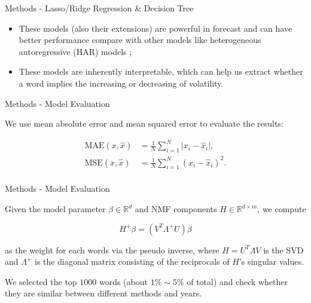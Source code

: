 \documentclass{beamer}
\begin{document}
\begin{frame}{Methods - Lasso/Ridge Regression \& Decision Tree}

  \begin{itemize}
    \item These models (also their extensions) are powerful in forecast and can have better performance compare with other models like heterogeneous autoregressive (HAR) models   ; \vspace{.25cm}
    \item These models are inherently interpretable, which can help us extract whether a word implies the increasing or decreasing of volatility.
  \end{itemize}

\end{frame}

\begin{frame}{Methods - Model Evaluation}

  We use mean absolute error and mean squared error to evaluate the results: \vspace{.25cm}

  $$
    \begin{aligned}
      \text{MAE}(x, \hat{x}) & = \frac{1}{N} \sum_{i=1}^N \vert x_i - \hat{x}_i \vert, \\
      \text{MSE}(x, \hat{x}) & = \frac{1}{N} \sum_{i=1}^N  (x_i - \hat{x}_i)^2.        \\
    \end{aligned}
  $$

\end{frame}

\begin{frame}{Methods - Model Evaluation}

  Given the model parameter $\beta \in \mathbb{R}^d$ and NMF components $H \in \mathbb{R}^{d \times m}$, we compute \vspace{.25cm}

  $$
    H^+ \beta = (V^T \Lambda^+ U) \beta
  $$ \vspace{.25cm}

  as the weight for each words via the pseudo inverse, where $H = U^T \Lambda V$ is the SVD and $\Lambda^+$ is the diagonal matrix consisting of the reciprocals of $H$’s singular values.

  We selected the top $1000$ words (about $1\% \sim 5\%$ of total) and check whether they are similar between different methods and years.

\end{frame}
\end{document}
